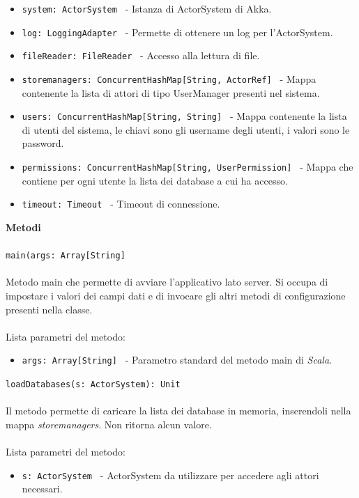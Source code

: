 \documentclass[a4paper]{article}
\begin{document}
			\begin{itemize}
				\item \texttt{system: ActorSystem } - Istanza di ActorSystem di Akka.
				\item \texttt{log: LoggingAdapter } - Permette di ottenere un log per l'ActorSystem.
				\item \texttt{fileReader: FileReader } - Accesso alla lettura di file.
				\item \texttt{storemanagers: ConcurrentHashMap[String, ActorRef] } - Mappa contenente la lista di attori di tipo UserManager presenti nel sistema.
				\item \texttt{users: ConcurrentHashMap[String, String] } - Mappa contenente la lista di utenti del sistema, le chiavi sono gli username degli utenti, i valori sono le password.
				\item \texttt{permissions: ConcurrentHashMap[String, UserPermission] } - Mappa che contiene per ogni utente la lista dei database a cui ha accesso.
				\item \texttt{timeout: Timeout } - Timeout di connessione.
			\end{itemize}
		\textbf{Metodi}
			\\ \\
			\texttt{main(args: Array[String]}
			\\ \\
			Metodo main che permette di avviare l'applicativo lato server. Si occupa di impostare i valori dei campi dati e di invocare gli altri metodi di configurazione presenti nella classe.
			\\ \\
			Lista parametri del metodo:
			\begin{itemize}
				\item \texttt{args: Array[String] } - Parametro standard del metodo main di \emph{Scala}.
			\end{itemize}
			\texttt{loadDatabases(s: ActorSystem): Unit}
			\\ \\
			Il metodo permette di caricare la lista dei database in memoria, inserendoli nella mappa \emph{storemanagers}. Non ritorna alcun valore.
			\\ \\
			Lista parametri del metodo:
			\begin{itemize}
				\item \texttt{s: ActorSystem } - ActorSystem da utilizzare per accedere agli attori necessari.
			\end{itemize}
\end{document}

